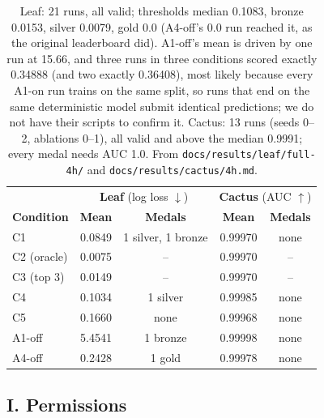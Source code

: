 \documentclass[11pt]{article}
\begin{document}
\begin{table}[H]
\centering
\small
\begin{tabular}{@{}lcccc@{}}
\toprule
& \multicolumn{2}{c}{\textbf{Leaf} (log loss $\downarrow$)} & \multicolumn{2}{c}{\textbf{Cactus} (AUC $\uparrow$)} \\
\textbf{Condition} & \textbf{Mean} & \textbf{Medals} & \textbf{Mean} & \textbf{Medals} \\
\midrule
C1 & 0.0849 & 1 silver, 1 bronze & 0.99970 & none \\
C2 (oracle) & 0.0075 & -- & 0.99970 & -- \\
C3 (top 3) & 0.0149 & -- & 0.99970 & -- \\
C4 & 0.1034 & 1 silver & 0.99985 & none \\
C5 & 0.1660 & none & 0.99968 & none \\
A1-off & 5.4541 & 1 bronze & 0.99998 & none \\
A4-off & 0.2428 & 1 gold & 0.99978 & none \\
\bottomrule
\end{tabular}
\caption{Leaf: 21 runs, all valid; thresholds median 0.1083, bronze 0.0153, silver
0.0079, gold 0.0 (A4-off's 0.0 run reached it, as the original leaderboard did). A1-off's mean is driven by one run at 15.66, and three runs in three
conditions scored exactly 0.34888 (and two exactly 0.36408), most likely because every
A1-on run trains on the same split, so runs that end on the same deterministic model
submit identical predictions; we do not have their scripts to confirm it. Cactus: 13 runs (seeds 0--2, ablations 0--1), all
valid and above the median 0.9991; every medal needs AUC 1.0. From
\texttt{docs/results/leaf/full-4h/} and \texttt{docs/results/cactus/4h.md}.}
\end{table}

\subsection*{I. Permissions}
\end{document}
